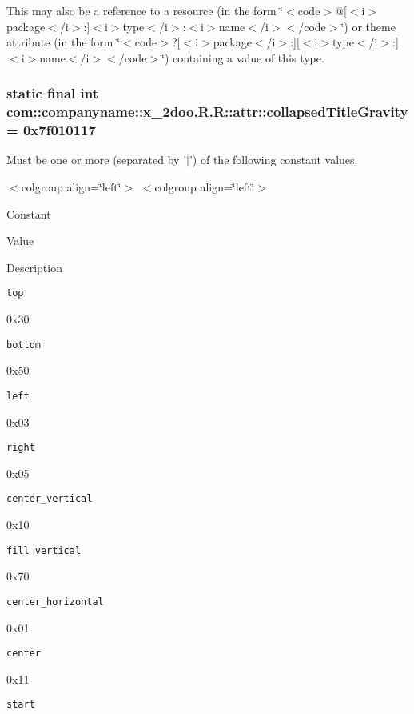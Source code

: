 This may also be a reference to a resource (in the form \char`\"{}$<$code$>$@\mbox{[}$<$i$>$package$<$/i$>$:\mbox{]}$<$i$>$type$<$/i$>$:$<$i$>$name$<$/i$>$$<$/code$>$\char`\"{}) or theme attribute (in the form \char`\"{}$<$code$>$?\mbox{[}$<$i$>$package$<$/i$>$:\mbox{]}\mbox{[}$<$i$>$type$<$/i$>$:\mbox{]}$<$i$>$name$<$/i$>$$<$/code$>$\char`\"{}) containing a value of this type. \hypertarget{classcom_1_1companyname_1_1x__2doo_1_1_r_1_1attr_fab432b5e853212eadf2aa741825070a}{
\subsubsection[{collapsedTitleGravity}]{\setlength{\rightskip}{0pt plus 5cm}static final int com::companyname::x\_\-2doo.R.R::attr::collapsedTitleGravity = 0x7f010117}}
\label{classcom_1_1companyname_1_1x__2doo_1_1_r_1_1attr_fab432b5e853212eadf2aa741825070a}


Must be one or more (separated by '$|$') of the following constant values. \begin{TabularC}{0}
\hline
\end{TabularC}
$<$colgroup align=\char`\"{}left\char`\"{}$>$ $<$colgroup align=\char`\"{}left\char`\"{}$>$ 

Constant

Value

Description 

{\tt top}

0x30

{\tt bottom}

0x50

{\tt left}

0x03

{\tt right}

0x05

{\tt center\_\-vertical}

0x10

{\tt fill\_\-vertical}

0x70

{\tt center\_\-horizontal}

0x01

{\tt center}

0x11

{\tt start}

